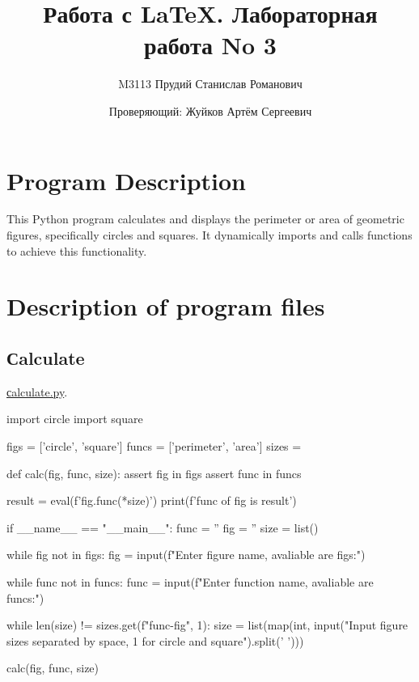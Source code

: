 \documentclass[12pt]{article}
\author{M3113 Прудий Станислав Романович \and Проверяющий: Жуйков Артём Сергеевич}
\title{Работа с LaTeX. Лабораторная работа No 3}
\date{}
\begin{document}
    

\maketitle

\newpage
\tableofcontents

\newpage

\section{Program Description}
This Python program calculates and displays the perimeter or area of geometric figures, specifically circles and squares. It dynamically imports and calls functions to achieve this functionality.

\newpage

\section{Description of program files}

\subsection{Сalculate}
\href{https://github.com/niumandzi/geometric_lib/blob/docs/calculate.py}{сalculate.py}.


\begin{python}
import circle
import square


figs = ['circle', 'square']
funcs = ['perimeter', 'area']
sizes = {}

def calc(fig, func, size):
	assert fig in figs
	assert func in funcs

	result = eval(f'{fig}.{func}(*{size})')
	print(f'{func} of {fig} is {result}')

if __name__ == "__main__":
	func = ''
	fig = ''
	size = list()
    
	while fig not in figs:
		fig = input(f"Enter figure name, avaliable are {figs}:\n")
	
	while func not in funcs:
		func = input(f"Enter function name, avaliable are {funcs}:\n")
	
	while len(size) != sizes.get(f"{func}-{fig}", 1):
		size = list(map(int, input("Input figure sizes separated by space, 1 for circle and square\n").split(' ')))
	
	calc(fig, func, size)
\end{python}

\newpage
\end{document}
